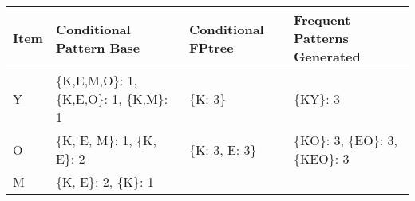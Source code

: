 \documentclass[11pt]{article}
\begin{document}
\begin{longtable}[]{@{}llll@{}}
\toprule
\begin{minipage}[b]{0.06\columnwidth}\raggedright\strut
Item\strut
\end{minipage} & \begin{minipage}[b]{0.36\columnwidth}\raggedright\strut
Conditional Pattern Base\strut
\end{minipage} & \begin{minipage}[b]{0.22\columnwidth}\raggedright\strut
Conditional FPtree\strut
\end{minipage} & \begin{minipage}[b]{0.25\columnwidth}\raggedright\strut
Frequent Patterns Generated\strut
\end{minipage}\tabularnewline
\midrule
\endhead
\begin{minipage}[t]{0.06\columnwidth}\raggedright\strut
Y\strut
\end{minipage} & \begin{minipage}[t]{0.36\columnwidth}\raggedright\strut
\{K,E,M,O\}: 1, \{K,E,O\}: 1, \{K,M\}: 1\strut
\end{minipage} & \begin{minipage}[t]{0.22\columnwidth}\raggedright\strut
\{K: 3\}\strut
\end{minipage} & \begin{minipage}[t]{0.25\columnwidth}\raggedright\strut
\{KY\}: 3\strut
\end{minipage}\tabularnewline
\begin{minipage}[t]{0.06\columnwidth}\raggedright\strut
O\strut
\end{minipage} & \begin{minipage}[t]{0.36\columnwidth}\raggedright\strut
\{K, E, M\}: 1, \{K, E\}: 2\strut
\end{minipage} & \begin{minipage}[t]{0.22\columnwidth}\raggedright\strut
\{K: 3, E: 3\}\strut
\end{minipage} & \begin{minipage}[t]{0.25\columnwidth}\raggedright\strut
\{KO\}: 3, \{EO\}: 3, \{KEO\}: 3\strut
\end{minipage}\tabularnewline
\begin{minipage}[t]{0.06\columnwidth}\raggedright\strut
M\strut
\end{minipage} & \begin{minipage}[t]{0.36\columnwidth}\raggedright\strut
\{K, E\}: 2, \{K\}: 1\strut
\end{minipage} & \begin{minipage}[t]{0.22\columnwidth}\raggedright\strut

\end{minipage}
\end{longtable}
\end{document}
